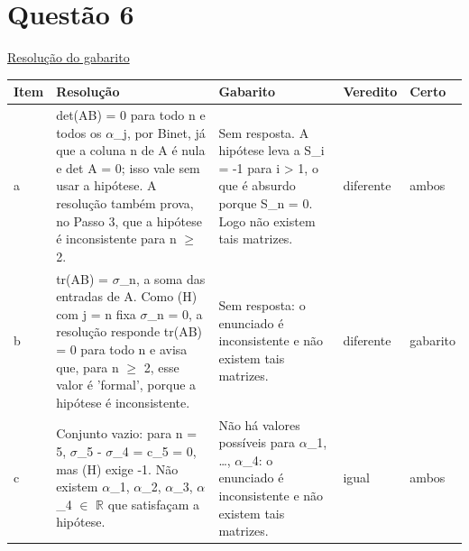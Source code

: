 \documentclass{article}%
\begin{document}
\section*{Questão 6}%
\href{https://poliedroresolve.sistemapoliedro.com.br/vestibulares/ita/2026/ita-2-fase-dia-1-28-10-2025-2-fase-dia-1/dissertativa-6-matematica-2-fase-dia-1-ita-2026}{Resolução do gabarito}\par\smallskip%
\begin{longtable}{@{}p{} p{} p{} p{} p{}@{}}\toprule Item & Resolução & Gabarito & Veredito & Certo \\ \midrule
a & det(AB) = 0 para todo n e todos os $\alpha$\_j, por Binet, já que a coluna n de A é nula e det A = 0; isso vale sem usar a hipótese. A resolução também prova, no Passo 3, que a hipótese é inconsistente para n $\geq$ 2. & Sem resposta. A hipótese leva a S\_i = -1 para i > 1, o que é absurdo porque S\_n = 0. Logo não existem tais matrizes. & diferente & ambos \\
b & tr(AB) = $\sigma$\_n, a soma das entradas de A. Como (H) com j = n fixa $\sigma$\_n = 0, a resolução responde tr(AB) = 0 para todo n e avisa que, para n $\geq$ 2, esse valor é 'formal', porque a hipótese é inconsistente. & Sem resposta: o enunciado é inconsistente e não existem tais matrizes. & diferente & gabarito \\
c & Conjunto vazio: para n = 5, $\sigma$\_5 - $\sigma$\_4 = c\_5 = 0, mas (H) exige -1. Não existem $\alpha$\_1, $\alpha$\_2, $\alpha$\_3, $\alpha$\_4 $\in$ $\mathbb{R}$ que satisfaçam a hipótese. & Não há valores possíveis para $\alpha$\_1, \ldots{}, $\alpha$\_4: o enunciado é inconsistente e não existem tais matrizes. & igual & ambos \\
\bottomrule\end{longtable}%
\end{document}
